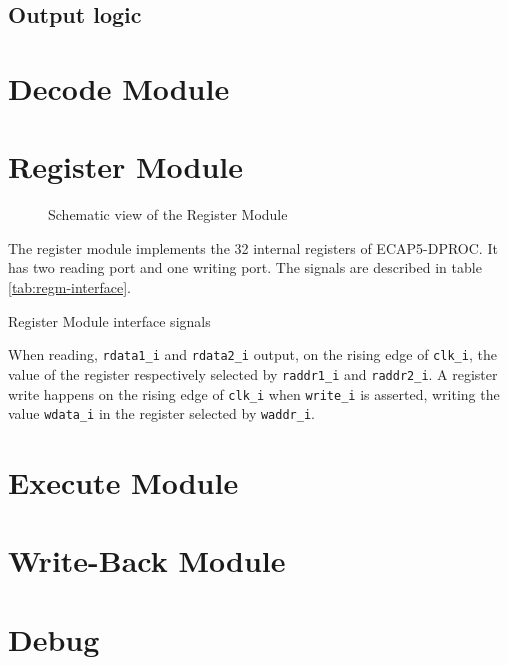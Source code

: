 

\subsection{Output logic}

\newpage
\section{Decode Module}
\newpage

\section{Register Module}

\begin{figure}[h!]
    \centering
    
    \caption{Schematic view of the Register Module}
    \label{fig:regm}
\end{figure}

\begin{content}
The register module implements the 32 internal registers of ECAP5-DPROC. It has two reading port and one writing port. The signals are described in table \ref{tab:regm-interface}. 
\end{content}

\begin{table}[H]
  \centering
  
  \caption{Register Module interface signals}
  \label{tab:regm-interface}
\end{table}

\begin{content}
  When reading, \texttt{rdata1\_i} and \texttt{rdata2\_i} output, on the rising edge of \texttt{clk\_i}, the value of the register respectively selected by \texttt{raddr1\_i} and \texttt{raddr2\_i}. A register write happens on the rising edge of \texttt{clk\_i} when \texttt{write\_i} is asserted, writing the value \texttt{wdata\_i} in the register selected by \texttt{waddr\_i}.
\end{content}

\newpage

\section{Execute Module}
\newpage

\section{Write-Back Module}
\newpage

\section{Debug}
\newpage
